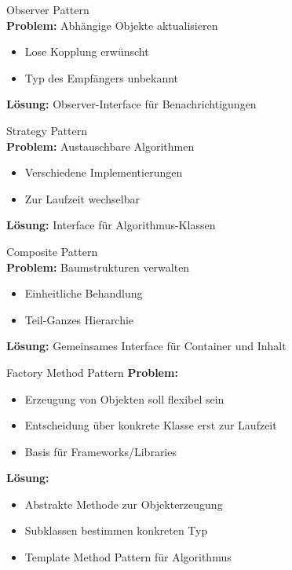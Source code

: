 \begin{definition}{Observer Pattern}\\
\textbf{Problem:} Abhängige Objekte aktualisieren
\begin{itemize}
    \item Lose Kopplung erwünscht
    \item Typ des Empfängers unbekannt
\end{itemize}
\textbf{Lösung:} Observer-Interface für Benachrichtigungen
\end{definition}

\begin{definition}{Strategy Pattern}\\
\textbf{Problem:} Austauschbare Algorithmen
\begin{itemize}
    \item Verschiedene Implementierungen
    \item Zur Laufzeit wechselbar
\end{itemize}
\textbf{Lösung:} Interface für Algorithmus-Klassen
\end{definition}

\begin{definition}{Composite Pattern}\\
\textbf{Problem:} Baumstrukturen verwalten
\begin{itemize}
    \item Einheitliche Behandlung
    \item Teil-Ganzes Hierarchie
\end{itemize}
\textbf{Lösung:} Gemeinsames Interface für Container und Inhalt
\end{definition}

\begin{definition}{Factory Method Pattern}
\textbf{Problem:}
\begin{itemize}
   \item Erzeugung von Objekten soll flexibel sein
   \item Entscheidung über konkrete Klasse erst zur Laufzeit
   \item Basis für Frameworks/Libraries
\end{itemize}

\textbf{Lösung:}
\begin{itemize}
   \item Abstrakte Methode zur Objekterzeugung
   \item Subklassen bestimmen konkreten Typ
   \item Template Method Pattern für Algorithmus
\end{itemize}
\end{definition}

